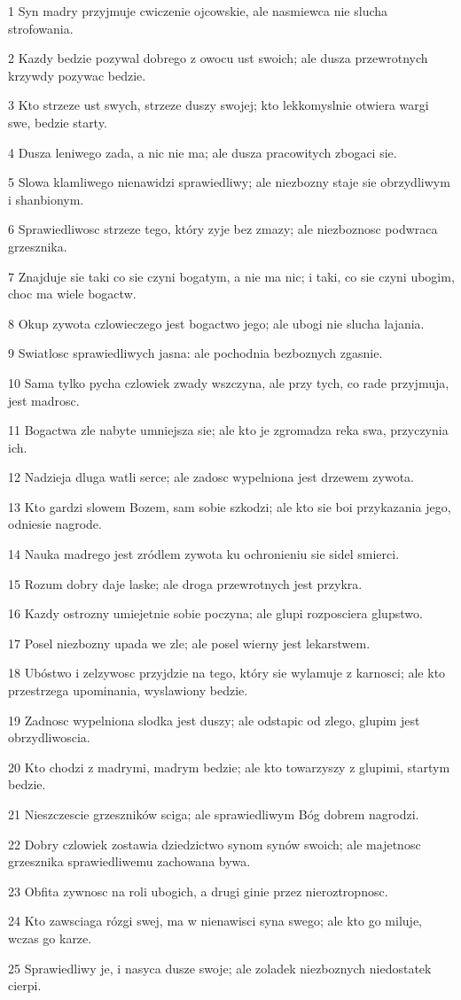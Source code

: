 \par 1 Syn madry przyjmuje cwiczenie ojcowskie, ale nasmiewca nie slucha strofowania.
\par 2 Kazdy bedzie pozywal dobrego z owocu ust swoich; ale dusza przewrotnych krzywdy pozywac bedzie.
\par 3 Kto strzeze ust swych, strzeze duszy swojej; kto lekkomyslnie otwiera wargi swe, bedzie starty.
\par 4 Dusza leniwego zada, a nic nie ma; ale dusza pracowitych zbogaci sie.
\par 5 Slowa klamliwego nienawidzi sprawiedliwy; ale niezbozny staje sie obrzydliwym i shanbionym.
\par 6 Sprawiedliwosc strzeze tego, który zyje bez zmazy; ale niezboznosc podwraca grzesznika.
\par 7 Znajduje sie taki co sie czyni bogatym, a nie ma nic; i taki, co sie czyni ubogim, choc ma wiele bogactw.
\par 8 Okup zywota czlowieczego jest bogactwo jego; ale ubogi nie slucha lajania.
\par 9 Swiatlosc sprawiedliwych jasna: ale pochodnia bezboznych zgasnie.
\par 10 Sama tylko pycha czlowiek zwady wszczyna, ale przy tych, co rade przyjmuja, jest madrosc.
\par 11 Bogactwa zle nabyte umniejsza sie; ale kto je zgromadza reka swa, przyczynia ich.
\par 12 Nadzieja dluga watli serce; ale zadosc wypelniona jest drzewem zywota.
\par 13 Kto gardzi slowem Bozem, sam sobie szkodzi; ale kto sie boi przykazania jego, odniesie nagrode.
\par 14 Nauka madrego jest zródlem zywota ku ochronieniu sie sidel smierci.
\par 15 Rozum dobry daje laske; ale droga przewrotnych jest przykra.
\par 16 Kazdy ostrozny umiejetnie sobie poczyna; ale glupi rozposciera glupstwo.
\par 17 Posel niezbozny upada we zle; ale posel wierny jest lekarstwem.
\par 18 Ubóstwo i zelzywosc przyjdzie na tego, który sie wylamuje z karnosci; ale kto przestrzega upominania, wyslawiony bedzie.
\par 19 Zadnosc wypelniona slodka jest duszy; ale odstapic od zlego, glupim jest obrzydliwoscia.
\par 20 Kto chodzi z madrymi, madrym bedzie; ale kto towarzyszy z glupimi, startym bedzie.
\par 21 Nieszczescie grzeszników sciga; ale sprawiedliwym Bóg dobrem nagrodzi.
\par 22 Dobry czlowiek zostawia dziedzictwo synom synów swoich; ale majetnosc grzesznika sprawiedliwemu zachowana bywa.
\par 23 Obfita zywnosc na roli ubogich, a drugi ginie przez nieroztropnosc.
\par 24 Kto zawsciaga rózgi swej, ma w nienawisci syna swego; ale kto go miluje, wczas go karze.
\par 25 Sprawiedliwy je, i nasyca dusze swoje; ale zoladek niezboznych niedostatek cierpi.

